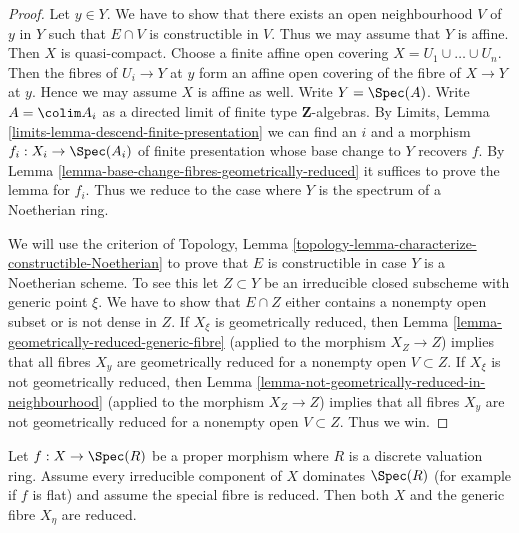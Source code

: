 \begin{proof}
Let $y \in Y$. We have to show that there exists an open neighbourhood
$V$ of $y$ in $Y$ such that $E \cap V$ is constructible in $V$. Thus we may
assume that $Y$ is affine. Then $X$ is quasi-compact.
Choose a finite affine open covering $X = U_1 \cup \ldots \cup U_n$.
Then the fibres of $U_i \to Y$ at $y$ form an affine open covering
of the fibre of $X \to Y$ at $y$. Hence we may assume $X$ is affine
as well.  Write $Y = \Spec(A)$.
Write $A = \colim A_i$ as a directed limit of finite type
$\mathbf{Z}$-algebras. By
Limits, Lemma \ref{limits-lemma-descend-finite-presentation}
we can find an $i$ and a morphism $f_i : X_i \to \Spec(A_i)$ of
finite presentation whose base change to $Y$ recovers $f$. By
Lemma \ref{lemma-base-change-fibres-geometrically-reduced}
it suffices to prove the lemma for $f_i$. Thus we reduce to
the case where $Y$ is the spectrum of a Noetherian ring.

\medskip\noindent
We will use the criterion of
Topology, Lemma \ref{topology-lemma-characterize-constructible-Noetherian}
to prove that $E$ is constructible in case $Y$ is a Noetherian scheme.
To see this let $Z \subset Y$ be an irreducible closed subscheme
with generic point $\xi$.
We have to show that $E \cap Z$ either contains a nonempty open subset
or is not dense in $Z$. If $X_\xi$ is geometrically reduced, then
Lemma \ref{lemma-geometrically-reduced-generic-fibre}
(applied to the morphism $X_Z \to Z$)
implies that all fibres $X_y$ are geometrically reduced
for a nonempty open $V \subset Z$.
If $X_\xi$ is not geometrically reduced, then
Lemma \ref{lemma-not-geometrically-reduced-in-neighbourhood}
(applied to the morphism $X_Z \to Z$)
implies that all fibres $X_y$ are not geometrically reduced
for a nonempty open $V \subset Z$. Thus we win.
\end{proof}

\begin{lemma}
\label{lemma-proper-flat-over-dvr-reduced-fibre}
Let $f : X \to \Spec(R)$ be a proper morphism where $R$ is a
discrete valuation ring. Assume every irreducible component
of $X$ dominates $\Spec(R)$ (for example if $f$ is flat) and
assume the special fibre is reduced. Then
both $X$ and the generic fibre $X_\eta$ are reduced.
\end{lemma}

